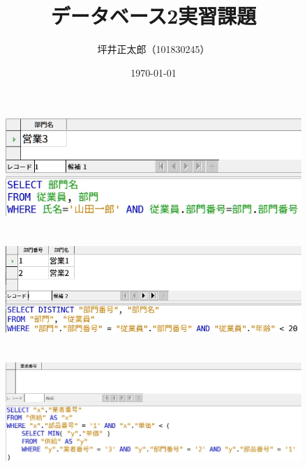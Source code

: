 \documentclass[a4paper,10pt]{jsarticle}
\begin{document}
\title{データベース2実習課題}
\author{坪井正太郎（101830245）}
\date{\today}
\maketitle

\section{}
\begin{figure}[H]
  \centering
  \includegraphics[width=\linewidth]{./(1).png}
  \caption{}
  \label{}
\end{figure}

\section{}
\begin{figure}[H]
  \centering
  \includegraphics[width=\linewidth]{./(2).png}
  \caption{}
  \label{}
\end{figure}

\section{}
\begin{figure}[H]
  \centering
  \includegraphics[width=\linewidth]{./(3).png}
  \caption{}
  \label{}
\end{figure}
\end{document}

